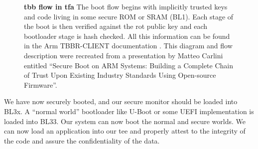 \begin{figure}[hp]
\centering

\caption[Arm Trusted Firmware Trusted Board Boot]{\textbf{\gls{tbb} flow in \gls{tfa}} The boot flow begins with implicitly trusted keys and code living in some secure ROM or SRAM (BL1). Each stage of the boot is then verified against the \gls{rot} public key and each bootloader stage is hash checked. All this information can be found in the Arm TBBR-CLIENT documentation \cite{ArmTrustedBoot}. This diagram and flow description were recreated from a presentation by Matteo Carlini entitled ``Secure Boot on ARM Systems: Building a Complete Chain of Trust Upon Existing Industry Standards Using Open-source Firmware''.}
\label{fig:tz-measure}
\end{figure}

We have now securely booted, and our secure monitor should be loaded into BL3x. A ``normal world'' bootloader like U-Boot or some UEFI implementation is loaded into BL33. Our system can now boot the normal and secure worlds. We can now load an application into our \gls{tee} and properly attest to the integrity of the code and assure the confidentiality of the data.

